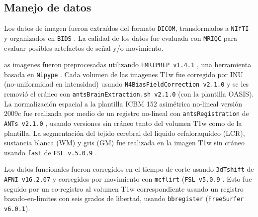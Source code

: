 \subsection{Manejo de datos}
Los datos de imagen fueron extraídos del formato \texttt{DICOM}, transformados a \texttt{NIfTI} y organizados en \texttt{BIDS} \parencite{Gorgolewski2016}.
La calidad de los datos fue evaluada con \texttt{MRIQC} \parencite{Esteban2017} para evaluar posibles artefactos de señal y/o movimiento. \par
as imagenes fueron preprocesadas utilizando \texttt{FMRIPREP v1.4.1} \parencite{Esteban2019}, una herramienta basada en \texttt{Nipype} \parencite{Gorgolewski2011}.
Cada volumen de las imagenes T1w fue corregido por INU (no-uniformidad en intensidad) usando \texttt{N4BiasFieldCorrection v2.1.0} \parencite{Tustison2010} y se les removió el cráneo con \texttt{antsBrainExtraction.sh v2.1.0} (con la plantilla OASIS).
La normalización espacial a la plantilla ICBM 152 asimétrica no-lineal versión 2009c \parencite{Fonov2009} fue realizada por medio de un registro no-lineal con \texttt{antsRegistration} de \texttt{ANTs v2.1.0} \parencite{Avants2007}, usando versiones sin cráneo tanto del volumen T1w como de la plantilla.
La segmentación del tejido cerebral del líquido cefaloraquídeo (LCR), sustancia blanca (WM) y gris (GM) fue realizada en la imagen T1w sin cráneo usando \texttt{fast} de \texttt{FSL v.5.0.9} \parencite{Zhang2001}.\par
Los datos funcionales fueron corregidos en el tiempo de corte usando \texttt{3dTshift} de \texttt{AFNI v16.2.07} \parencite{Cox1996} y corregidos por movimiento con \texttt{mcflirt} (\texttt{FSL v5.0.9} \parencite{Jenkinson2002}.
Esto fue seguido por un co-registro al volumen T1w correspondiente usando un registro basado-en-límites \parencite{Greve2009} con seis grados de libertad, usando \texttt{bbregister} (\texttt{FreeSurfer v6.0.1}).

















